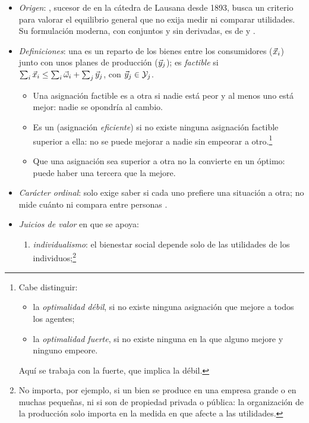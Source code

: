 \documentclass[11pt]{article}
\begin{document}
\begin{itemize}
\item \emph{Origen}: , sucesor de  en la cátedra de Lausana desde 1893, busca un criterio para valorar el equilibrio general que no exija medir ni comparar utilidades\nocite{Pareto1906Manuale}. Su formulación moderna, con conjuntos y sin derivadas, es de \textcite{Arrow1951Extension} y \textcite{Debreu1959Theory}.
\item \emph{Definiciones}: una  es un reparto de los bienes entre los consumidores ($\vec{x}_i$) junto con unos planes de producción ($\vec{y}_j$); es \emph{factible} si $\sum_i\vec{x}_i\leq\sum_i\vec{\omega}_i+\sum_j\vec{y}_j$, con $\vec{y}_j\in\mathcal{Y}_j$.
  \begin{itemize}
  \item Una asignación factible es  a otra si nadie está peor y al menos uno está mejor: nadie se opondría al cambio.
  \item Es un  (asignación \emph{eficiente}) si no existe ninguna asignación factible  superior a ella: no se puede mejorar a nadie sin empeorar a otro.\footnote{Cabe distinguir:
\begin{itemize}
\item la \emph{optimalidad débil}, si no existe ninguna asignación que mejore a todos los agentes;
\item la \emph{optimalidad fuerte}, si no existe ninguna en la que alguno mejore y ninguno empeore.
\end{itemize}
Aquí se trabaja con la fuerte, que implica la débil.}
  \item Que una asignación sea  superior a otra no la convierte en un óptimo: puede haber una tercera que la mejore.
  \end{itemize}
\item \emph{Carácter ordinal}: solo exige saber si cada uno prefiere una situación a otra; no mide cuánto ni compara entre personas .
\item \emph{Juicios de valor} en que se apoya\nocite{GravelleRees2004Microeconomics}:
  \begin{enumerate}
  \item \emph{individualismo}: el bienestar social depende solo de las utilidades de los individuos;\footnote{No importa, por ejemplo, si un bien se produce en una empresa grande o en muchas pequeñas, ni si son de propiedad privada o pública: la organización de la producción solo importa en la medida en que afecte a las utilidades.}

\end{enumerate}
\end{itemize}
\end{document}
